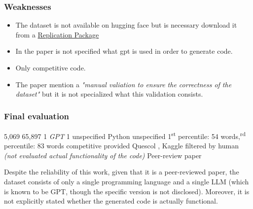 \subsubsection*{Weaknesses}
\begin{itemize}
    \item The dataset is not available on hugging face but is necessary
    download it from a 
    \href{{https://figshare.com/articles/dataset/Replication_Package/24298036?file=42649573}}{Replication Package}
    \item In the paper is not specified what gpt is used in order to generate code.
    \item Only competitive code.
    \item The paper mention a \textit{"manual valiation to ensure the correctness of the dataset"}
    but it is not specialized what this validation consists.
\end{itemize}


\subsubsection*{Final evaluation}


\expandafter\def\csname Pan-et-alHumanCode\endcsname{5,069}
\expandafter\def\csname Pan-et-alLLMCode\endcsname{65,897}
\expandafter\def\csname Pan-et-alNumLLMs\endcsname{1 \textit{GPT}}
\expandafter\def\csname Pan-et-alLLMDiversity\endcsname{1}
\expandafter\def\csname Pan-et-alCurrentUse\endcsname{unspecified}
\expandafter\def\csname Pan-et-alLanguages\endcsname{Python}
\expandafter\def\csname Pan-et-alCodeTypes\endcsname{unspecified}
\expandafter\def\csname Pan-et-alCodeSize\endcsname{1\textsuperscript{st} percentile: 54 words,\textsuperscript{rd} percentile: 83 words}
\expandafter\def\csname Pan-et-alCodeContext\endcsname{competitive}
\expandafter\def\csname Pan-et-alPrompts\endcsname{provided}
\expandafter\def\csname Pan-et-alSources\endcsname{ Quescol \cite{quescol2023}, Kaggle \cite{wikipediaKaggle2023}}
\expandafter\def\csname Pan-et-alCodeQuality\endcsname{filtered by human \textit{(not evaluated
actual functionality of the code)}}
\expandafter\def\csname Pan-et-alReliability\endcsname{Peer-review paper}


Despite the reliability of this work, given that it is a peer-reviewed paper, 
the dataset consists of only a single programming language and a single LLM 
(which is known to be GPT, though the specific version is not disclosed). 
Moreover, it is not explicitly stated whether the generated code is actually 
functional.


